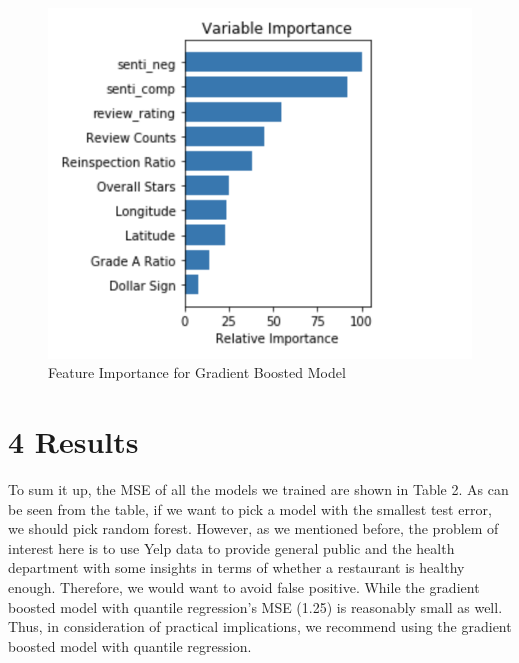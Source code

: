 \documentclass[letterpaper, 11 pt, conference]{ieeeconf}
\begin{document}
\begin{figure}[h]
	\centering
    \includegraphics[scale = 0.6]{gradient_boosted_features}
    \caption{Feature Importance for Gradient Boosted Model}
\end{figure}

\newpage
\section*{4 Results}
To sum it up, the MSE of all the models we trained are shown in Table 2. As can be seen from the table, if we want to pick a model with the smallest test error, we should pick random forest. However, as we mentioned before, the problem of interest here is to use Yelp data to provide general public and the health department with some insights in terms of whether a restaurant is healthy enough. Therefore, we would want to avoid false positive. While the gradient boosted model with quantile regression's MSE (1.25) is reasonably small as well. Thus, in consideration of practical implications, we recommend using the gradient boosted model with quantile regression. 
\end{document}

